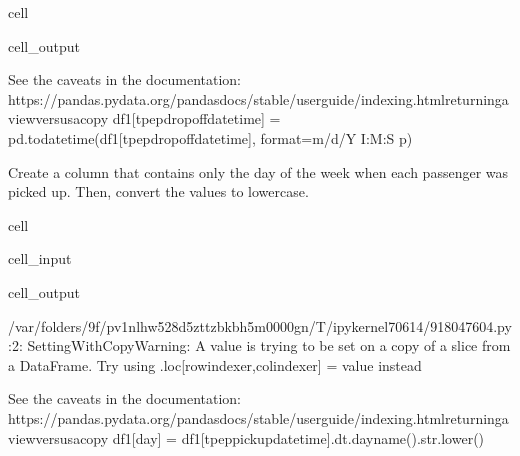 \documentclass[letterpaper,10pt,english]{sphinxmanual}
\begin{document}
\begin{sphinxuseclass}{cell}
\begin{sphinxuseclass}{cell_output}
\begin{sphinxVerbatim}[commandchars=\\\{\}]
See the caveats in the documentation: https://pandas.pydata.org/pandas\PYGZhy{}docs/stable/user\PYGZus{}guide/indexing.html\PYGZsh{}returning\PYGZhy{}a\PYGZhy{}view\PYGZhy{}versus\PYGZhy{}a\PYGZhy{}copy
  df1[\PYGZsq{}tpep\PYGZus{}dropoff\PYGZus{}datetime\PYGZsq{}] = pd.to\PYGZus{}datetime(df1[\PYGZsq{}tpep\PYGZus{}dropoff\PYGZus{}datetime\PYGZsq{}], format=\PYGZsq{}\PYGZpc{}m/\PYGZpc{}d/\PYGZpc{}Y \PYGZpc{}I:\PYGZpc{}M:\PYGZpc{}S \PYGZpc{}p\PYGZsq{})
\end{sphinxVerbatim}

\end{sphinxuseclass}
\end{sphinxuseclass}
\sphinxAtStartPar
Create a  column that contains only the day of the week when each passenger was picked up. Then, convert the values to lowercase.

\begin{sphinxuseclass}{cell}
\begin{sphinxuseclass}{cell_input}
\begin{sphinxVerbatim}[commandchars=\\\{\}]
\PYG{p}{[}\PYG{p}{]}  \PYG{p}{[}\PYG{p}{]}
\end{sphinxVerbatim}

\end{sphinxuseclass}
\begin{sphinxuseclass}{cell_output}
\begin{sphinxVerbatim}[commandchars=\\\{\}]
/var/folders/9f/pv1nlhw528d\PYGZus{}5zttzbkb\PYGZus{}h5m0000gn/T/ipykernel\PYGZus{}70614/918047604.py:2: SettingWithCopyWarning: 
A value is trying to be set on a copy of a slice from a DataFrame.
Try using .loc[row\PYGZus{}indexer,col\PYGZus{}indexer] = value instead

See the caveats in the documentation: https://pandas.pydata.org/pandas\PYGZhy{}docs/stable/user\PYGZus{}guide/indexing.html\PYGZsh{}returning\PYGZhy{}a\PYGZhy{}view\PYGZhy{}versus\PYGZhy{}a\PYGZhy{}copy
  df1[\PYGZsq{}day\PYGZsq{}] = df1[\PYGZsq{}tpep\PYGZus{}pickup\PYGZus{}datetime\PYGZsq{}].dt.day\PYGZus{}name().str.lower()
\end{sphinxVerbatim}

\end{sphinxuseclass}
\end{sphinxuseclass}
\end{document}
